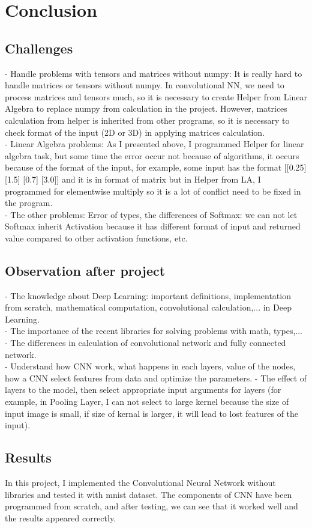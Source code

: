\documentclass{article}
\begin{document}
\section{Conclusion}
\subsection{Challenges}
- Handle problems with tensors and matrices without numpy: It is really hard to handle matrices or tensors without numpy. In convolutional NN, we need to process matrices and tensors much, so it is necessary to create Helper from Linear Algebra to replace numpy from calculation in the project. However, matrices calculation from helper is inherited from other programs, so it is necessary to check format of the input (2D or 3D) in applying matrices calculation.  \\
- Linear Algebra problems: As I presented above, I programmed Helper for linear algebra task, but some time the error occur not because of algorithms, it occurs because of the format of the input, for example, some input has the format [[0.25] [1.5] [0.7] [3.0]] and it is in format of matrix but in Helper from LA, I programmed for elementwise multiply so it is a lot of conflict need to be fixed in the program. \\
- The other problems: Error of types, the differences of Softmax: we can not let Softmax inherit Activation because it has different format of input and returned value compared to other activation functions, etc.
\subsection{Observation after project}
- The knowledge about Deep Learning: important definitions, implementation from scratch, mathematical computation, convolutional calculation,... in Deep Learning. \\
- The importance of the recent libraries for solving problems with math, types,... \\
- The differences in calculation of convolutional network and fully connected network.\\
- Understand how CNN work, what happens in each layers, value of the nodes, how a CNN select features from data and optimize the parameters.
- The effect of layers to the model, then select appropriate input arguments for layers (for example, in Pooling Layer, I can not select to large kernel because the size of input image is small, if size of kernal is larger, it will lead to lost features of the input). 
\subsection{Results}
In this project, I implemented the Convolutional Neural Network without libraries and tested it with mnist dataset. The components of CNN have been programmed from scratch, and after testing, we can see that it worked well and the results appeared correctly.
\end{document}
